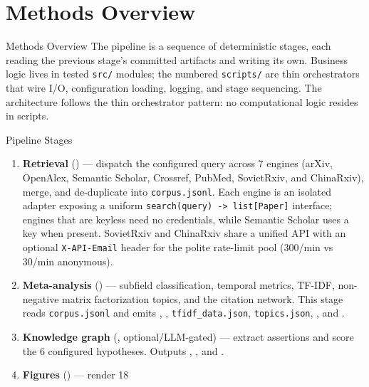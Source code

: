 \documentclass[
  ignorenonframetext,
]{beamer}
\author{\texorpdfstring{}{}}
\date{}
\begin{document}
\section{Methods Overview}\label{methods-overview}

\begin{frame}{Methods Overview}
The pipeline is a sequence of deterministic stages, each reading the
previous stage's committed artifacts and writing its own. Business logic
lives in tested \texttt{src/} modules; the numbered \texttt{scripts/}
are thin orchestrators that wire I/O, configuration loading, logging,
and stage sequencing. The architecture follows the thin orchestrator
pattern: no computational logic resides in scripts.
\end{frame}

\begin{frame}{Pipeline Stages}
\protect{}\label{pipeline-stages}
\begin{enumerate}
\item
  \textbf{Retrieval} () --- dispatch
  the configured query across 7 engines (arXiv, OpenAlex, Semantic
  Scholar, Crossref, PubMed, SovietRxiv, and ChinaRxiv), merge, and
  de-duplicate into \texttt{corpus.jsonl}. Each engine is an isolated
  adapter exposing a uniform
  \texttt{search(query)\ -\textgreater{}\ list{[}Paper{]}} interface;
  engines that are keyless need no credentials, while Semantic Scholar
  uses a key when present. SovietRxiv and ChinaRxiv share a unified API
  with an optional \texttt{X-API-Email} header for the polite rate-limit
  pool (300/min vs 30/min anonymous).
\item
  \textbf{Meta-analysis} () ---
  subfield classification, temporal metrics, TF-IDF, non-negative matrix
  factorization topics, and the citation network. This stage reads
  \texttt{corpus.jsonl} and emits
  ,
  , \texttt{tfidf\_data.json},
  \texttt{topics.json}, , and
  .
\item
  \textbf{Knowledge graph} (,
  optional/LLM-gated) --- extract assertions and score the 6 configured
  hypotheses. Outputs ,
  , and
  .
\item
  \textbf{Figures} () --- render 18

\end{enumerate}
\end{frame}
\end{document}

